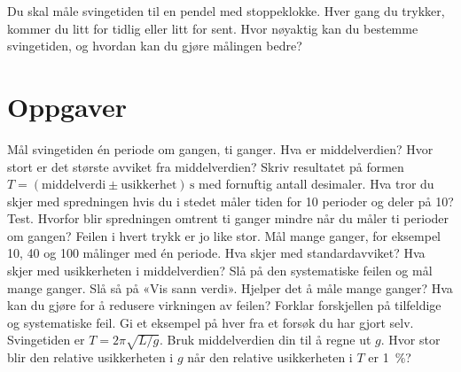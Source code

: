 \documentclass[11pt]{article}
\begin{document}

Du skal måle svingetiden til en pendel med stoppeklokke. Hver gang du trykker, kommer du litt for tidlig eller litt for sent. Hvor nøyaktig kan du bestemme svingetiden, og hvordan kan du gjøre målingen bedre?

\section*{Oppgaver}

\begin{oppgaveliste}
\oppgave {}Mål svingetiden én periode om gangen, ti ganger. Hva er middelverdien? Hvor stort er det største avviket fra middelverdien? Skriv resultatet på formen $T = (\text{middelverdi} \pm \text{usikkerhet})\,\mathrm{s}$ med fornuftig antall desimaler.
\svar
\oppgave {}Hva tror du skjer med spredningen hvis du i stedet måler tiden for 10 perioder og deler på 10? Test.
\svar
\oppgave {}Hvorfor blir spredningen omtrent ti ganger mindre når du måler ti perioder om gangen? Feilen i hvert trykk er jo like stor.
\svar
\oppgave {}Mål mange ganger, for eksempel 10, 40 og 100 målinger med én periode. Hva skjer med standardavviket? Hva skjer med usikkerheten i middelverdien?
\svar
\oppgave {}Slå på den systematiske feilen og mål mange ganger. Slå så på «Vis sann verdi». Hjelper det å måle mange ganger? Hva kan du gjøre for å redusere virkningen av feilen?
\svar
\oppgave {}Forklar forskjellen på tilfeldige og systematiske feil. Gi et eksempel på hver fra et forsøk du har gjort selv.
\svar
\oppgave {}Svingetiden er $T = 2π\sqrt{L/g}$. Bruk middelverdien din til å regne ut $g$. Hvor stor blir den relative usikkerheten i $g$ når den relative usikkerheten i $T$ er 1~\%?
\svar
\end{oppgaveliste}
\end{document}
